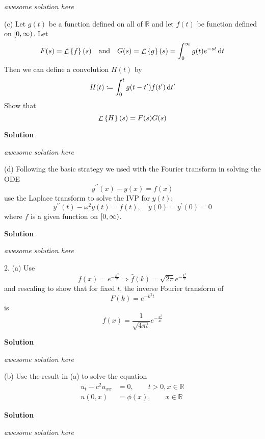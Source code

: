 \documentclass{article}
\DeclareMathOperator{\Lagr}{\mathcal{L}}
\begin{document}
\textit{awesome solution here}

\vspace{5mm}

(c) Let $g(t)$ be a function defined on all of $\mathbb{R}$ and let
$f(t)$ be function defined on $\intco{0, \infty}$. Let
%
\begin{equation*}
    F(s) = \Lagr \cbr{f}(s)
    \quad \text{and} \quad
    G(s) = \Lagr \cbr{g}(s) = \int_0^\infty g(t) e^{-s t} \dif t
\end{equation*}
%
Then we can define a convolution $H(t)$ by
%
\begin{equation*}
    H(t) \coloneqq \int_0^t g(t - t^\prime) f(t^\prime) \dif t^\prime
\end{equation*}
%
Show that
%
\begin{equation*}
    \Lagr \cbr{H}(s) = F(s) G(s)
\end{equation*}

\textbf{Solution}

\textit{awesome solution here}

\vspace{5mm}

(d) Following the basic strategy we used with the Fourier transform in
solving the ODE
%
\begin{equation*}
    y^{\prime \prime}(x) - y(x) = f(x)
\end{equation*}
%
use the Laplace transform to solve the IVP for $y(t)$:
%
\begin{equation*}
    y^{\prime \prime}(t) - \omega^2 y(t) = f(t)
    ,\quad
    y(0) = y^\prime(0) = 0
\end{equation*}
%
where $f$ is a given function on $\intco{0, \infty}$.

\textbf{Solution}

\textit{awesome solution here}

\newpage

2. (a) Use
%
\begin{equation*}
    f(x) = e^{- \frac{x^2}{2}} \Rightarrow \widehat{f}(k) = \sqrt{2 \pi} e^{- \frac{k^2}{2}}
\end{equation*}
%
and rescaling to show that for fixed $t$, the inverse Fourier transform of
%
\begin{equation*}
    F(k) = e^{- k^2 t}
\end{equation*}
%
is
%
\begin{equation*}
    f(x) = \frac{1}{\sqrt{4 \pi t}} e^{- \frac{x^2}{4 t}}
\end{equation*}

\textbf{Solution}

\textit{awesome solution here}

\vspace{5mm}

(b) Use the result in (a) to solve the equation
%
\begin{align*}
    u_t - c^2 u_{x x} &= 0, \quad \quad t > 0, x \in \mathbb{R} \\
    u(0, x) &= \phi(x), \quad \quad x \in \mathbb{R}
\end{align*}

\textbf{Solution}

\textit{awesome solution here}
\end{document}
